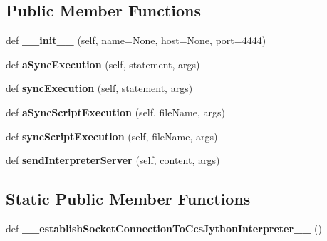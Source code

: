 \subsection*{Public Member Functions}
\begin{DoxyCompactItemize}
\item 
def {\bfseries \+\_\+\+\_\+init\+\_\+\+\_\+} (self, name=None, host=None, port=4444)\hypertarget{class_libraries_1_1_python_binding_1_1_ccs_jython_interpreter_a2a12492ec87a55fdb9da9abe1e52c720}{}\label{class_libraries_1_1_python_binding_1_1_ccs_jython_interpreter_a2a12492ec87a55fdb9da9abe1e52c720}

\item 
def {\bfseries a\+Sync\+Execution} (self, statement, args)\hypertarget{class_libraries_1_1_python_binding_1_1_ccs_jython_interpreter_a10b2ae723ea5d513cc2134afb1d7eb64}{}\label{class_libraries_1_1_python_binding_1_1_ccs_jython_interpreter_a10b2ae723ea5d513cc2134afb1d7eb64}

\item 
def {\bfseries sync\+Execution} (self, statement, args)\hypertarget{class_libraries_1_1_python_binding_1_1_ccs_jython_interpreter_a4c3c525d6087413216720c3e5f9dcb6d}{}\label{class_libraries_1_1_python_binding_1_1_ccs_jython_interpreter_a4c3c525d6087413216720c3e5f9dcb6d}

\item 
def {\bfseries a\+Sync\+Script\+Execution} (self, file\+Name, args)\hypertarget{class_libraries_1_1_python_binding_1_1_ccs_jython_interpreter_a663299e289b4b76262edb905cc9878cc}{}\label{class_libraries_1_1_python_binding_1_1_ccs_jython_interpreter_a663299e289b4b76262edb905cc9878cc}

\item 
def {\bfseries sync\+Script\+Execution} (self, file\+Name, args)\hypertarget{class_libraries_1_1_python_binding_1_1_ccs_jython_interpreter_aefb021c423e993aa6951d076030aa4e1}{}\label{class_libraries_1_1_python_binding_1_1_ccs_jython_interpreter_aefb021c423e993aa6951d076030aa4e1}

\item 
def {\bfseries send\+Interpreter\+Server} (self, content, args)\hypertarget{class_libraries_1_1_python_binding_1_1_ccs_jython_interpreter_a710f1a1ff6d82629df7c8bb9f5680bd4}{}\label{class_libraries_1_1_python_binding_1_1_ccs_jython_interpreter_a710f1a1ff6d82629df7c8bb9f5680bd4}

\end{DoxyCompactItemize}
\subsection*{Static Public Member Functions}
\begin{DoxyCompactItemize}
\item 
def {\bfseries \+\_\+\+\_\+establish\+Socket\+Connection\+To\+Ccs\+Jython\+Interpreter\+\_\+\+\_\+} ()\hypertarget{class_libraries_1_1_python_binding_1_1_ccs_jython_interpreter_af7a03e6d84d0ce12d7b8592bd5ca2d10}{}\label{class_libraries_1_1_python_binding_1_1_ccs_jython_interpreter_af7a03e6d84d0ce12d7b8592bd5ca2d10}

\end{DoxyCompactItemize}
